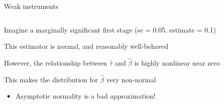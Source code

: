 \documentclass[notes,11pt, aspectratio=169]{beamer}
\newenvironment{wideitemize}{\itemize\addtolength{\itemsep}{10pt}}{\enditemize}
\begin{document}
\begin{frame}{Weak instruments}
  \begin{columns}[T] %
    \begin{column}{0.5\textwidth}
  \begin{wideitemize}
  \item<1-> Imagine a marginally significant first stage (se = 0.05, estimate = 0.1)
  \item<1-> This estimator is normal, and reasonably well-behaved
  \item<2-> However, the relationship between $\hat{\tau}$ and
    $\hat{\beta}$ is highly nonlinear near zero
  \item<3-> This makes the distribution for $\hat{\beta}$ very
    non-normal
    \begin{itemize}
    \item Asymptotic normality is a bad approximation!
    \end{itemize}
  \end{wideitemize}
\end{column}
\begin{column}{0.5\textwidth}

\end{column}
\end{columns}
\end{frame}
\end{document}
